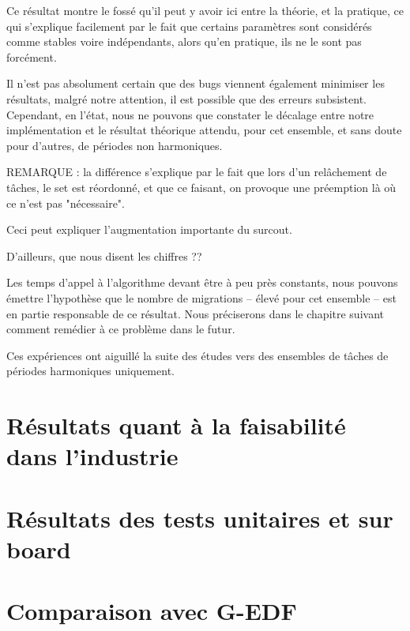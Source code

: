 	Ce résultat montre le fossé qu'il peut y avoir ici entre la théorie, et la pratique, ce qui 
	s'explique facilement par le fait que certains paramètres sont considérés comme stables 
	voire indépendants, alors qu'en pratique, ils ne le sont pas forcément. \newline
	
	Il n'est pas absolument certain que des bugs viennent également minimiser les résultats, malgré notre 
	attention, il est possible que des erreurs subsistent. Cependant, en l'état, nous ne pouvons que constater le décalage 
	entre notre implémentation et le résultat théorique attendu, pour cet ensemble, et sans doute pour d'autres, 
	de périodes non harmoniques.\newline
	
	REMARQUE : la différence s'explique par le fait que lors d'un relâchement de tâches, 
	le set est réordonné, et que ce faisant, on provoque une préemption là où ce n'est pas 
	"nécessaire".
	
	Ceci peut expliquer l'augmentation importante du surcout.
	
	D'ailleurs, que nous disent les chiffres ??
	
	
	
	
	Les temps d'appel à l'algorithme devant être à peu près constants, nous pouvons émettre l'hypothèse que le nombre 
	de migrations -- élevé pour cet ensemble -- est en partie responsable de ce résultat. Nous préciserons dans le chapitre suivant 
	comment remédier à ce problème dans le futur.\newline
	
	Ces expériences ont aiguillé la suite des études vers des ensembles de tâches de périodes harmoniques uniquement.

\section{Résultats quant à la faisabilité dans l'industrie}

	

\section{Résultats des tests unitaires et sur board}

	

\section{Comparaison avec G-EDF}

	